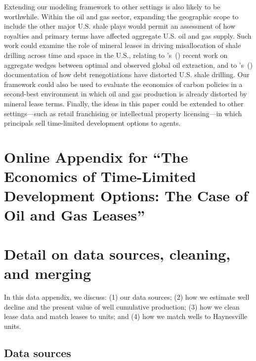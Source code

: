 \documentclass[12pt]{article}
\newcommand\cites[1]{\citeauthor{#1}'s\ (\citeyear{#1})}
\begin{document}
Extending our modeling framework to other settings is also likely to be worthwhile. Within the oil and gas sector, expanding the geographic scope to include the other major U.S. shale plays would permit an assessment of how royalties and primary terms have affected aggregate U.S. oil and gas supply. Such work could examine the role of mineral leases in driving misallocation of shale drilling across time and space in the U.S., relating to \cites{bib:askeretal} recent work on aggregate wedges between optimal and observed global oil extraction, and to \cites{bib:gilje} documentation of how debt renegotiations have distorted U.S. shale drilling. Our framework could also be used to evaluate the economics of carbon policies in a second-best environment in which oil and gas production is already distorted by mineral lease terms. Finally, the ideas in this paper could be extended to other settings---such as retail franchising or intellectual property licensing---in which principals sell time-limited development options to agents.





\singlespace
\newpage


\appendix
\setcounter{page}{1}
\renewcommand{\thepage}{A-\arabic{page}}

\section*{Online Appendix for ``The Economics of Time-Limited Development Options: The Case of Oil and Gas Leases''}




\section{Detail on data sources, cleaning, and merging} \label{appx:data}

In this data appendix, we discuss: (1) our data sources; (2) how we estimate well decline and the present value of well cumulative production; (3) how we clean lease data and match leases to units; and (4) how we match wells to Haynesville units.

\subsection{Data sources}
\end{document}
